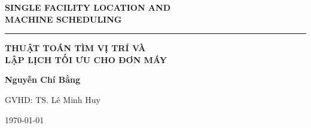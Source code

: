 \documentclass[12pt,a4paper]{report}
\begin{document}
 
    \begin{titlepage}
	\centering
    \phantom{}\par
	\vspace{3cm}
	{\LARGE\textbf{SINGLE FACILITY LOCATION AND \\ MACHINE SCHEDULING }\par}
	\vspace{1cm}
	\rule{5cm}{0.5pt}\par
	\vspace{1cm}
		{\LARGE\textbf{THUẬT TOÁN TÌM VỊ TRÍ VÀ \\ LẬP LỊCH TỐI ƯU CHO ĐƠN MÁY}\par}
	\vspace{1cm}
	\Large\textbf{Nguyễn Chí Bằng}\par		
	\vspace{1cm}
	\Large{GVHD: TS. Lê Minh Huy}\par		
	\vspace{1cm}
    \today
    \end{titlepage}

\newpage
\thispagestyle{empty} %
\mbox{}

	\tableofcontents

	\newpage
	\thispagestyle{empty} %
	\mbox{}
\end{document}
